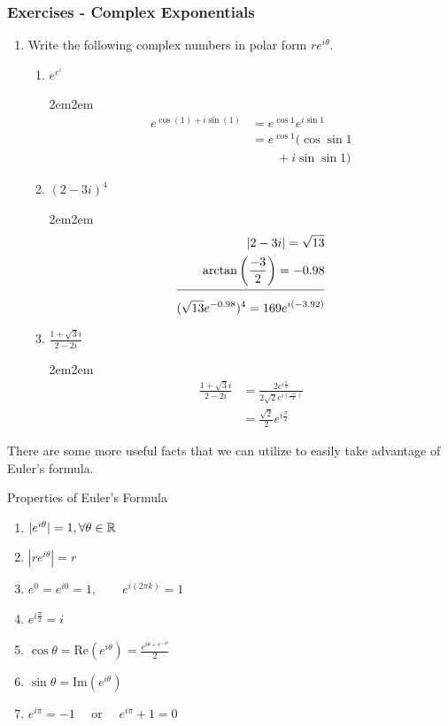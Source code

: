 \documentclass[10pt]{paper}
\newcommand{\gspc}{\vspace{0.13cm}} %
\newcommand{\cpr}[1]{\left(#1\right)}
\renewcommand{\Re}[1]{\text{Re}\left(#1\right)}
\renewcommand{\Im}[1]{\text{Im}\left(#1\right)}
\newcommand{\ahline}{\\[3pt]\hline\\[-8pt]}
\let\endoldproof\endproof
\newenvironment{problem}[1]
  {\vspace{-0.1cm}\begin{coloredadjust}\begin{adjustwidth}{2em}{2em}#1}
  {\endoldproof
\end{adjustwidth}\end{coloredadjust}\gspc}
\begin{document}
\subsubsection{Exercises - Complex Exponentials}
\begin{enumerate}
  \item Write the following complex numbers in polar form $re^{i\theta}$.
  \begin{enumerate}
    \item $e^{e^i}$
    \begin{problem}
      \begin{align*}
        e^{\cos(1) + i\sin(1)}&= e^{\cos 1}e^{i\sin 1}\\
        &= e^{\cos 1}(\cos\sin 1 \\&\quad\quad+ i \sin\sin 1)
      \end{align*}
    \end{problem}
    \item $(2 - 3i)^4$
    \begin{problem}
      \begin{align*}
        |2 - 3i| = \sqrt{13}\\
        \arctan\cpr{\frac{-3}2} = -0.98\ahline
        (\sqrt{13}e^{-0.98})^4 = 169e^{i(-3.92)}
      \end{align*}
    \end{problem}
    \item $\frac{1+\sqrt 3i}{2-2i}$
    \begin{problem}
      \begin{align*}
      \frac{1+\sqrt 3i}{2-2i}&= \frac{2e^{i\frac{\pi}3}}{2\sqrt 2 e^{i\cpr{\frac{-\pi}4}}}\\
      &= \frac{\sqrt 2}2 e^{i\frac{\pi}2}
    \end{align*}
    \end{problem}
  \end{enumerate}
\end{enumerate}
There are some more useful facts that we can utilize to easily take advantage of Euler's formula.
\begin{theorem}{Properties of Euler's Formula}{}
  \begin{enumerate}
    \item $|e^{i\theta}|=1, \forall \theta \in \mathbb{R}$
    \item $|re^{i\theta}|=r$
    \item $e^0=e^{i0}=1,\quad\quad e^{i(2\pi k)}=1$
    \item $e^{i\frac{\pi}2}= i$
    \item $\cos\theta = \Re{e^{i\theta}}=\frac{e^{i\theta + e^{-i\theta}}}2$
    \item $\sin \theta = \Im{e^{i\theta}}$
    \item $e^{i\pi}=-1\quad\text{ or }\quad e^{i\pi}+1=0$
  \end{enumerate}
\end{theorem}
\end{document}
